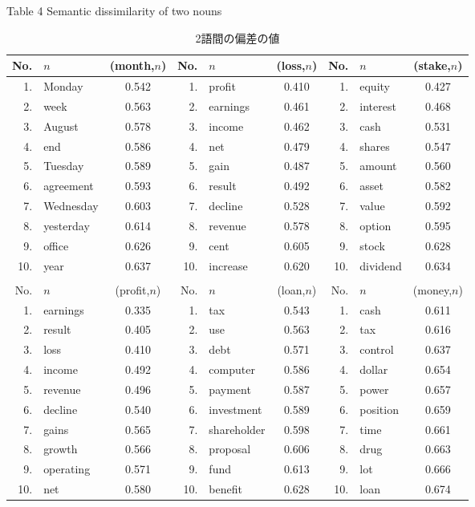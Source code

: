 {\footnotesize
\begin{table}[htbp]
\begin{center}
\caption{2語間の偏差の値} \label{noun}
Table 4 Semantic dissimilarity of two nouns \\
\begin{tabular}{rlc|rlc|rlc} \hline \hline
No. &$n$ &{\footnotesize (month,$n$)} &No. &$n$ &{\footnotesize
(loss,$n$)} &No. &$n$ &{\footnotesize (stake,$n$)}
\\ \hline
1. &Monday    &0.542  &1.  &profit   &0.410  &1. &equity   &0.427 \\
2. &week      &0.563  &2.  &earnings &0.461  &2. &interest &0.468 \\
3. &August    &0.578  &3.  &income   &0.462  &3. &cash     &0.531 \\
4. &end       &0.586  &4.  &net      &0.479  &4. &shares   &0.547 \\
5. &Tuesday   &0.589  &5.  &gain     &0.487  &5. &amount   &0.560 \\
6. &agreement &0.593  &6.  &result   &0.492  &6. &asset
&0.582 \\ 
7. &Wednesday &0.603  &7.  &decline  &0.528  &7. &value    &0.592 \\
8. &yesterday &0.614  &8.  &revenue  &0.578  &8. &option
&0.595 \\ 
9. &office    &0.626  &9.  &cent     &0.605  &9. &stock    &0.628 \\
10. &year     &0.637  &10. &increase &0.620  &10. &dividend &0.634 \\ \hline
 &     &\multicolumn{1}{r}{}  & & &\multicolumn{1}{r}{}  & & & \\
\hline \hline
No. &$n$ &{\footnotesize (profit,$n$)} &No. &$n$ &{\footnotesize
(loan,$n$)} &No. &$n$ &{\footnotesize (money,$n$)} \\ \hline
1. &earnings    &0.335 &1. &tax         &0.543 &1.  &cash &0.611 \\
2. &result      &0.405 &2. &use         &0.563 &2.  &tax &0.616 \\
3. &loss        &0.410 &3. &debt        &0.571 &3.  &control &0.637 \\
4. &income      &0.492 &4. &computer    &0.586 &4.  &dollar &0.654 \\
5. &revenue     &0.496 &5. &payment     &0.587 &5.  &power &0.657 \\
6. &decline     &0.540 &6. &investment  &0.589 &6.  &position &0.659 \\
7. &gains       &0.565 &7. &shareholder &0.598 &7.  &time &0.661 \\
8. &growth      &0.566 &8. &proposal    &0.606 &8.  &drug &0.663 \\
9. &operating   &0.571 &9. &fund        &0.613 &9.  &lot &0.666 \\
10. &net        &0.580 &10. &benefit    &0.628 &10. &loan &0.674 \\ \hline
\end{tabular}
\end{center}
\end{table}
}


